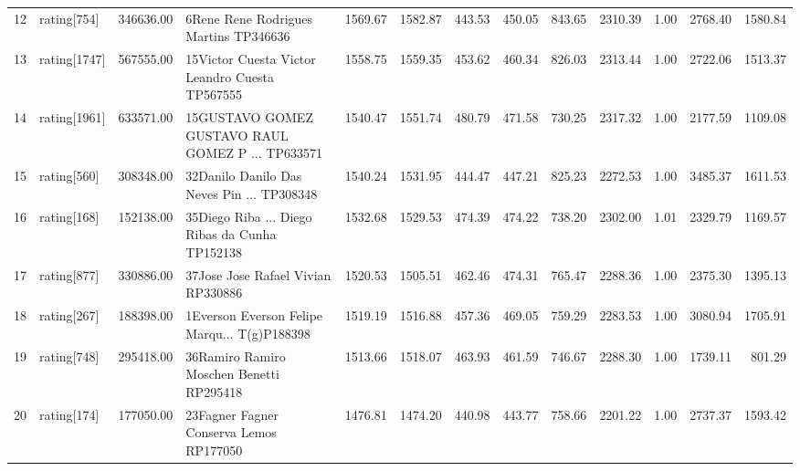 \begin{table}[ht]
\begin{tabular}{rlrlrrrrrrrrr}
  12 & rating[754] & 346636.00 & 6Rene Rene Rodrigues Martins TP346636 & 1569.67 & 1582.87 & 443.53 & 450.05 & 843.65 & 2310.39 & 1.00 & 2768.40 & 1580.84 \\ 
  13 & rating[1747] & 567555.00 & 15Victor Cuesta Victor Leandro Cuesta TP567555 & 1558.75 & 1559.35 & 453.62 & 460.34 & 826.03 & 2313.44 & 1.00 & 2722.06 & 1513.37 \\ 
  14 & rating[1961] & 633571.00 & 15GUSTAVO GOMEZ GUSTAVO RAUL GOMEZ P ... TP633571 & 1540.47 & 1551.74 & 480.79 & 471.58 & 730.25 & 2317.32 & 1.00 & 2177.59 & 1109.08 \\ 
  15 & rating[560] & 308348.00 & 32Danilo Danilo Das Neves Pin ... TP308348 & 1540.24 & 1531.95 & 444.47 & 447.21 & 825.23 & 2272.53 & 1.00 & 3485.37 & 1611.53 \\ 
  16 & rating[168] & 152138.00 & 35Diego Riba ... Diego Ribas da Cunha TP152138 & 1532.68 & 1529.53 & 474.39 & 474.22 & 738.20 & 2302.00 & 1.01 & 2329.79 & 1169.57 \\ 
  17 & rating[877] & 330886.00 & 37Jose Jose Rafael Vivian RP330886 & 1520.53 & 1505.51 & 462.46 & 474.31 & 765.47 & 2288.36 & 1.00 & 2375.30 & 1395.13 \\ 
  18 & rating[267] & 188398.00 & 1Everson Everson Felipe Marqu... T(g)P188398 & 1519.19 & 1516.88 & 457.36 & 469.05 & 759.29 & 2283.53 & 1.00 & 3080.94 & 1705.91 \\ 
  19 & rating[748] & 295418.00 & 36Ramiro Ramiro Moschen Benetti RP295418 & 1513.66 & 1518.07 & 463.93 & 461.59 & 746.67 & 2288.30 & 1.00 & 1739.11 & 801.29 \\ 
  20 & rating[174] & 177050.00 & 23Fagner Fagner Conserva Lemos RP177050 & 1476.81 & 1474.20 & 440.98 & 443.77 & 758.66 & 2201.22 & 1.00 & 2737.37 & 1593.42 \\ 
   \hline
\end{tabular}
\end{table}

